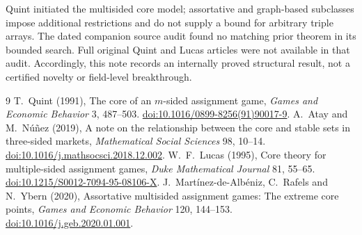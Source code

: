 \documentclass[11pt]{article}
\begin{document}
Quint initiated the multisided core model; assortative and graph-based
subclasses impose additional restrictions and do not supply a bound for
arbitrary triple arrays. The dated companion source audit found no matching
prior theorem in its bounded search. Full original Quint and Lucas articles
were not available in that audit. Accordingly, this note records an internally
proved structural result, not a certified novelty or field-level breakthrough.

\begin{thebibliography}{9}
\footnotesize\setlength{\itemsep}{2pt}
 T.~Quint (1991), The core of an $m$-sided assignment game,
\emph{Games and Economic Behavior} 3, 487--503.
\href{https://doi.org/10.1016/0899-8256(91)90017-9}{doi:10.1016/0899-8256(91)90017-9}.
 A.~Atay and M.~N\'u\~nez (2019), A note on the relationship
between the core and stable sets in three-sided markets,
\emph{Mathematical Social Sciences} 98, 10--14.
\href{https://doi.org/10.1016/j.mathsocsci.2018.12.002}{doi:10.1016/j.mathsocsci.2018.12.002}.
 W.~F.~Lucas (1995), Core theory for multiple-sided assignment
games, \emph{Duke Mathematical Journal} 81, 55--65.
\href{https://doi.org/10.1215/S0012-7094-95-08106-X}{doi:10.1215/S0012-7094-95-08106-X}.
 J.~Mart\'inez-de-Alb\'eniz, C.~Rafels and N.~Ybern (2020),
Assortative multisided assignment games: The extreme core points,
\emph{Games and Economic Behavior} 120, 144--153.
\href{https://doi.org/10.1016/j.geb.2020.01.001}{doi:10.1016/j.geb.2020.01.001}.
\end{thebibliography}
\end{document}
